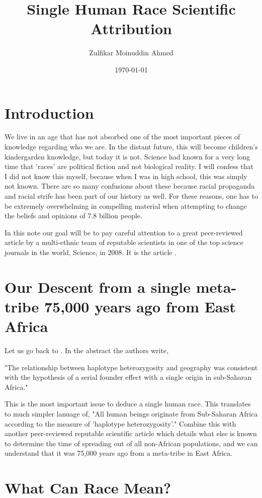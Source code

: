 \documentclass{amsart}
\title{Single Human Race Scientific Attribution}
\author{Zulfikar Moinuddin Ahmed}
\date{\today}
\begin{document}
\maketitle

\section{Introduction}
We live in an age that has not absorbed one of the most important pieces of knowledge regarding who we are.  In the distant future, this will become children's kindergarden knowledge, but today it is not.  Science had known for a very long time that 'races' are political fiction and not biological reality.  I will confess that I did not know this myself, because when I was in high school, this was simply not known. There are so many confusions about these because racial propaganda and racial strife has been part of our history as well.  For these reasons, one has to be extremely overwhelming in compelling material when attempting to change the beliefs and opinions of 7.8 billion people.

In this note our goal will be to pay careful attention to a great peer-reviewed article by a multi-ethnic team of reputable scientists in one of the top science journals in the world, Science, in 2008.  It is the article \cite{Li08}.

\section{Our Descent from a single meta-tribe 75,000 years ago from East Africa}

Let us go back to \cite{Li08}.  In the abstract the authors write, 

"The relationship between haplotype heterozygosity and geography was consistent with the hypothesis of a serial founder effect with a single origin in sub-Saharan Africa."  

This is the most important issue to deduce a single human race.  This translates to much simpler lanuage of, "All human beings originate from Sub-Saharan Africa according to the measure of 'haplotype heterozygosity'."  Combine this with another peer-reviewed reputable scientific article \cite{SM} which details what else is known to determine the time of spreading out of all non-African populations, and we can understand that it was 75,000 years ago from a meta-tribe in East Africa.

\section{What Can Race Mean?}
\end{document}
